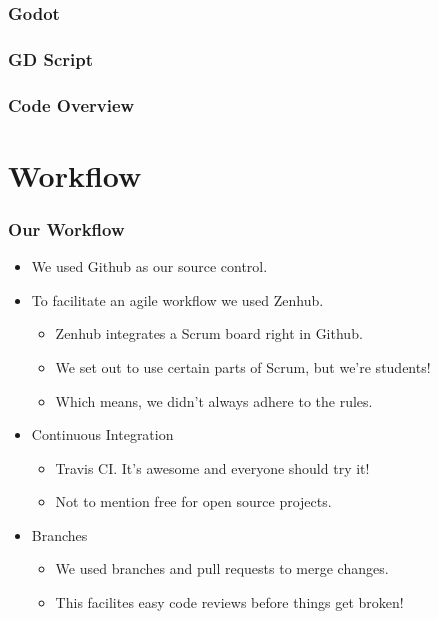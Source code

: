 \documentclass{beamer}
\begin{document}
\begin{frame}
    \frametitle{Godot} %
\end{frame}

\begin{frame}
    \frametitle{GD Script} %
\end{frame}

\begin{frame}
    \frametitle{Code Overview} %
\end{frame}


\section{Workflow} %
\begin{frame}
    \frametitle{Our Workflow} 
    \begin{itemize}
    		\pause \item We used Github as our source control.
    		\pause \item To facilitate an agile workflow we used Zenhub.
    		\begin{itemize}
    		\pause \item Zenhub integrates a Scrum board right in Github.
    		\pause \item We set out to use certain parts of Scrum, but we're students!
    		\pause \item Which means, we didn't always adhere to the rules.
    		\end{itemize}
    		\pause \item Continuous Integration
    		\begin{itemize}
    			\pause \item Travis CI. It's awesome and everyone should try it!
    			\pause \item Not to mention free for open source projects. 
    		\end{itemize}
    		\pause \item Branches
    		\begin{itemize}
    			\pause \item We used branches and pull requests to merge changes.
    			\pause \item This facilites easy code reviews before things get broken!
    		\end{itemize}
    \end{itemize}
\end{frame}
\end{document}
